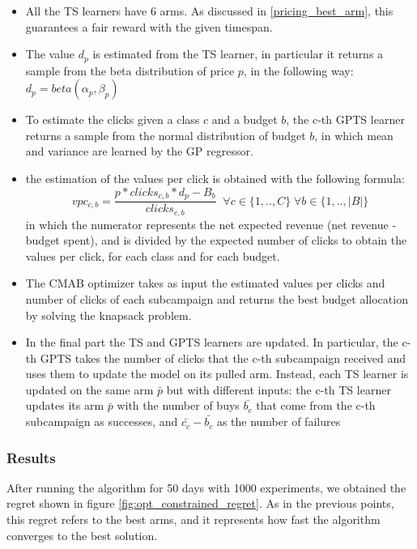 \begin{itemize}
    \item All the TS learners have 6 arms. As discussed in \ref{pricing_best_arm}, this guarantees a fair reward with the given timespan. 
    \item The value $d_p$ is estimated from the TS learner, in particular it returns a sample from the beta distribution of price $p$, in the following way: $d_p = beta(\alpha_p, \beta_p)$
    \item To estimate the clicks given a class $c$ and a budget $b$, the c-th GPTS learner returns a sample from the normal distribution of budget $b$, in which mean and variance are learned by the GP regressor.
    \item the estimation of the values per click is obtained with the following formula: 
    \[ vpc_{c,b} = \frac{p * clicks_{c,b} * d_p - B_b}{clicks_{c,b}} \;\; \forall c \in \{1,..,C\} \; \forall b \in \{1,..,|B|\} \]
    in which the numerator represents the net expected revenue (net revenue - budget spent), and is divided by the expected number of clicks to obtain the values per click, for each class and for each budget.
    \item The CMAB optimizer takes as input the estimated values per clicks and number of clicks of each subcampaign and returns the best budget allocation by solving the knapsack problem.
    \item In the final part the TS and GPTS learners are updated. In particular, the c-th GPTS takes the number of clicks that the c-th subcampaign received and uses them to update the model on its pulled arm.
    Instead, each TS learner is updated on the same arm $\bar{p}$ but with different inputs: the c-th TS learner updates its arm $\bar{p}$ with the number of buys $\bar{b_c}$ that come from the c-th subcampaign as successes, and $\bar{c_c} - \bar{b_c}$ as the number of failures
\end{itemize}

\subsubsection{Results}
After running the algorithm for 50 days with 1000 experiments, we obtained the regret shown in figure \ref{fig:opt_constrained_regret}.
As in the previous points, this regret refers to the best arms, and it represents how fast the algorithm converges to the best solution.


